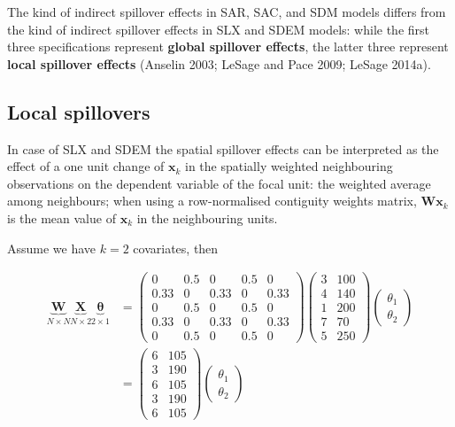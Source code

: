 \documentclass[
  letterpaper,
]{scrbook}
\begin{document}
The kind of indirect spillover effects in SAR, SAC, and SDM models
differs from the kind of indirect spillover effects in SLX and SDEM
models: while the first three specifications represent \textbf{global
spillover effects}, the latter three represent \textbf{local spillover
effects} (Anselin 2003; LeSage and Pace 2009; LeSage 2014a).

\hypertarget{local-spillovers}{%
\subsection{Local spillovers}\label{local-spillovers}}

In case of SLX and SDEM the spatial spillover effects can be interpreted
as the effect of a one unit change of \({\boldsymbol{\mathbf{x}}}_k\) in
the spatially weighted neighbouring observations on the dependent
variable of the focal unit: the weighted average among neighbours; when
using a row-normalised contiguity weights matrix,
\({\boldsymbol{\mathbf{W}}} {\boldsymbol{\mathbf{x}}}_k\) is the mean
value of \({\boldsymbol{\mathbf{x}}}_k\) in the neighbouring units.

Assume we have \(k =2\) covariates, then

\[
\begin{split}
\underbrace{\boldsymbol{\mathbf{W}}}_{N \times N}  \underbrace{\boldsymbol{\mathbf{X}}}_{N \times 2} \underbrace{\boldsymbol{\mathbf{\theta}}}_{2 \times 1} & = 
\begin{pmatrix}
      0 & 0.5 & 0 & 0.5 & 0 \\
      0.33 & 0 & 0.33 & 0 & 0.33 \\
      0 & 0.5 & 0 & 0.5 & 0 \\
      0.33 & 0 & 0.33 & 0 & 0.33 \\
      0 & 0.5 & 0 & 0.5 & 0
  \end{pmatrix}
  \begin{pmatrix}
      3 & 100 \\
      4 & 140 \\
      1 & 200 \\
      7 & 70  \\
      5 & 250 
  \end{pmatrix}
    \begin{pmatrix}
      \theta_1 \\
      \theta_2 
  \end{pmatrix}\\
 & =   
 \begin{pmatrix}
      6 & 105 \\
      3 & 190 \\
      6 & 105 \\
      3 & 190  \\
      6 & 105 
  \end{pmatrix}
 \begin{pmatrix}
      \theta_1 \\
      \theta_2
  \end{pmatrix}\\
\end{split} 
\]
\end{document}
